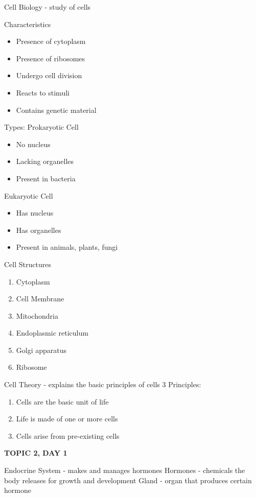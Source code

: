 {{Cell Biology - study of cells


Characteristics
\begin{itemize}
    \item Presence of cytoplasm
    \item Presence of ribosomes
    \item Undergo cell division
    \item Reacts to stimuli
    \item Contains genetic material
\end{itemize}

Types:
Prokaryotic Cell
\begin{itemize}
    \item No nucleus
    \item Lacking organelles
    \item Present in bacteria
\end{itemize}
Eukaryotic Cell
\begin{itemize}
    \item Has nucleus
    \item Has organelles
    \item Present in animals, plants, fungi
\end{itemize}

Cell Structures
\begin{enumerate}
    \item Cytoplasm
    \item Cell Membrane
    \item Mitochondria
    \item Endoplasmic reticulum
    \item Golgi apparatus
    \item Ribosome
\end{enumerate}


Cell Theory - explains the basic principles of cells
3 Principles:
\begin{enumerate}
    \item Cells are the basic unit of life
    \item Life is made of one or more cells
    \item Cells arise from pre-existing cells
\end{enumerate}

\textbf{TOPIC 2, DAY 1}


Endocrine System - makes and manages hormones
Hormones - chemicals the body releases for growth and development
Gland - organ that produces certain hormone


}}

